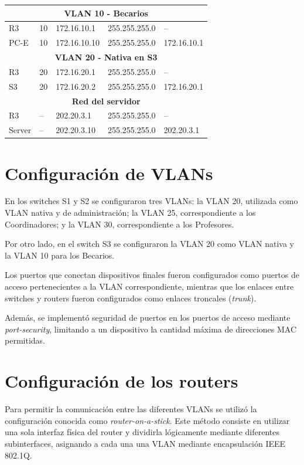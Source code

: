 \documentclass[12pt]{article}
\begin{document}
\begin{center}
\begin{tabular}{|l|l|l|l|l|}
\multicolumn{5}{|c|}{\textbf{VLAN 10 - Becarios}} \\
\hline
R3 & 10 & 172.16.10.1 & 255.255.255.0 & -- \\
PC-E & 10 & 172.16.10.10 & 255.255.255.0 & 172.16.10.1 \\
\hline

\multicolumn{5}{|c|}{\textbf{VLAN 20 - Nativa en S3}} \\
\hline
R3 & 20 & 172.16.20.1 & 255.255.255.0 & -- \\
S3 & 20 & 172.16.20.2 & 255.255.255.0 & 172.16.20.1 \\
\hline

\multicolumn{5}{|c|}{\textbf{Red del servidor}} \\
\hline
R3 & -- & 202.20.3.1 & 255.255.255.0 & -- \\
Server & -- & 202.20.3.10 & 255.255.255.0 & 202.20.3.1 \\
\hline

\end{tabular}
\end{center}


\section{Configuración de VLANs}

En los switches S1 y S2 se configuraron tres VLANs: la VLAN 20, utilizada
como VLAN nativa y de administración; la VLAN 25, correspondiente a los
Coordinadores; y la VLAN 30, correspondiente a los Profesores.

Por otro lado, en el switch S3 se configuraron la VLAN 20 como VLAN nativa y
la VLAN 10 para los Becarios.

Los puertos que conectan dispositivos finales fueron configurados como
puertos de acceso pertenecientes a la VLAN correspondiente, mientras que los
enlaces entre switches y routers fueron configurados como enlaces troncales
(\textit{trunk}).

Además, se implementó seguridad de puertos en los puertos de acceso mediante
\textit{port-security}, limitando a un dispositivo la cantidad máxima de
direcciones MAC permitidas.


\section{Configuración de los routers}

Para permitir la comunicación entre las diferentes VLANs se utilizó la
configuración conocida como \textit{router-on-a-stick}. Este método consiste
en utilizar una sola interfaz física del router y dividirla lógicamente
mediante diferentes subinterfaces, asignando a cada una una VLAN mediante
encapsulación IEEE 802.1Q.
\end{document}
